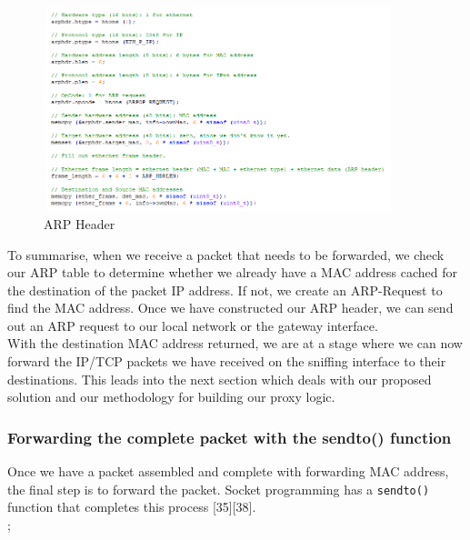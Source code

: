 \documentclass{uathesis}
\begin{document}
\begin{figure}[h!]
    \centering
    \includegraphics[width=0.9\textwidth]{Capture.PNG}
    \caption{ARP Header}
    \label{fig:Filling fields of ArpHeader struct}
\end{figure}

To summarise, when we receive a packet that needs to be forwarded, we check our ARP table to determine whether we already have a MAC address cached for the destination of the packet IP address. If not, we create an ARP-Request to find the MAC address. Once we have constructed our ARP header, we can send out an ARP request to our local network or the gateway interface.\\

With the destination MAC address returned, we are at a stage where we can now forward the IP/TCP packets we have received on the sniffing interface to their destinations. This leads into the next section which deals with our proposed solution and our methodology for building our proxy logic. \\

\subsubsection{Forwarding the complete packet with the sendto() function}
Once we have a packet assembled and complete with forwarding MAC address, the final step is to forward the packet. Socket programming has a {\tt sendto()} function that completes this process [35][38]. \\

;\\
\end{document}
